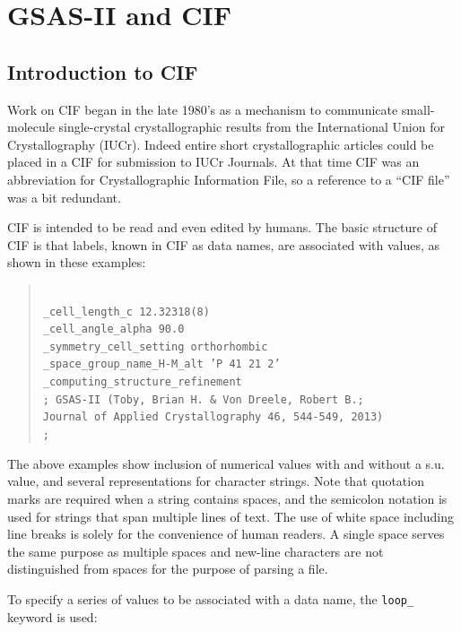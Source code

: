 \chapter{GSAS-II and CIF}\label{Chap:G2CIF}

\section{Introduction to CIF}
Work on CIF began in the late 1980's as a mechanism to communicate small-molecule single-crystal crystallographic results from the International Union for Crystallography (IUCr). Indeed  entire short crystallographic articles could be placed in a CIF for submission to IUCr Journals. 
At that time CIF was an abbreviation for Crystallographic Information File, so a reference to a ``CIF file'' was a bit redundant. 

CIF is intended to be read and even edited by humans. The basic structure of CIF is that labels, known in CIF as data names, are associated with values, as shown in these examples: 
\begin{quote}
\texttt{\\
\_cell\_length\_c                  12.32318(8)\\
\_cell\_angle\_alpha               90.0\\
\_symmetry\_cell\_setting          orthorhombic\\
\_space\_group\_name\_H-M\_alt       'P 41 21 2'\\
\_computing\_structure\_refinement\\
;  GSAS-II (Toby, Brian H. \& Von Dreele, Robert B.;\\
Journal of Applied Crystallography 46, 544-549, 2013)\\
;\\
}    
\end{quote}
The above examples show inclusion of numerical values with and without a s.u. value, and several representations for character strings. Note that quotation marks are required when a string contains spaces, and the semicolon notation is used for strings that span multiple lines of text. The use of white space including line breaks is solely for the convenience of human readers. A single space serves the same purpose as multiple spaces and new-line characters are not distinguished from spaces for the purpose of parsing a file. 

To specify a series of values to be associated with a data name, the \texttt{loop\_}
keyword is used: 

